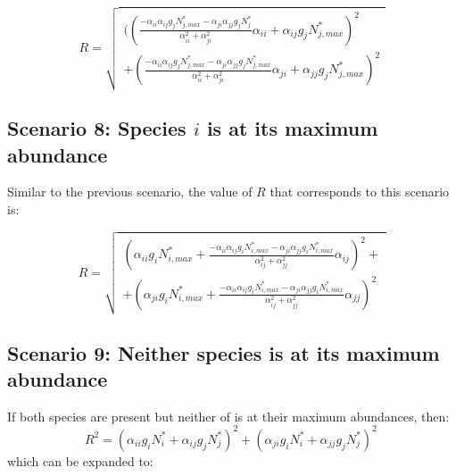 \begin{refsection}
\begin{equation}
  R = \sqrt{
\begin{aligned}
  ((\frac{- \alpha_{ii}\alpha_{ij}g_{j}N_{j,max}^{*} - \alpha_{ji}\alpha_{jj}g_{j}N_{j}^{*}}{\alpha_{ii}^2 + \alpha_{ji}^2}\alpha_{ii} + \alpha_{ij}g_{j}N_{j,max}^{*} )^2 \\
  + (\frac{- \alpha_{ii}\alpha_{ij}g_{j}N_{j,max}^{*} - \alpha_{ji}\alpha_{jj}g_{j}N_{j,max}^{*}}{\alpha_{ii}^2 + \alpha_{ji}^2}\alpha_{ji} + \alpha_{jj}g_{j}N_{j,max}^{*} )^2
\end{aligned}
}
\label{scenario7}
\end{equation}



\subsection*{Scenario 8: Species $i$ is at its maximum abundance}

Similar to the previous scenario, the value of $R$ that corresponds to this scenario is:


\begin{equation}
  R = \sqrt{
\begin{aligned}
  (\alpha_{ii}g_{i}N_{i,max}^{*} + \frac{-\alpha_{ii}\alpha_{ij}g_{i}N_{i,max}^{*} - \alpha_{ji}\alpha_{jj}g_{i}N_{i,max}^{*}}{\alpha_{ij}^{2} + \alpha_{jj}^{2}}\alpha_{ij} )^2 +\\
  + (\alpha_{ji}g_{i}N_{i,max}^{*} + \frac{-\alpha_{ii}\alpha_{ij}g_{i}N_{i,max}^{*} - \alpha_{ji}\alpha_{jj}g_{i}N_{i,max}^{*}}{\alpha_{ij}^{2} + \alpha_{jj}^{2}}\alpha_{jj} )^2
\end{aligned}
}
\label{scenario8}
\end{equation}


\subsection*{Scenario 9: Neither species is at its maximum abundance}

If both species are present but neither of is at their maximum abundances, then:
\begin{equation}
  R^{2} =  (\alpha_{ii}g_{i}N_{i}^{*} + \alpha_{ij}g_{j}N_{j}^{*}) ^{2} + (\alpha_{ji}g_{i}N_{i}^{*} +\alpha_{jj}g_{j}N_{j}^{*})^{2} \,
\end{equation}
which can be expanded to:


\end{refsection}

